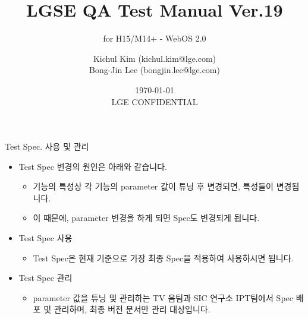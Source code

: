 \documentclass{beamer}
\title[WebOS 2.0 QA spec \alert{LGE CONFIDENTIAL}] %
{LGSE QA Test Manual Ver.19}
\subtitle
{for H15/M14+ - WebOS 2.0} %
\author[Kichul Kim, Bong-Jin Lee] %
{Kichul Kim (kichul.kim@lge.com)\\Bong-Jin Lee (bongjin.lee@lge.com)}
\institute[IPT team, SIC lab., LG Electronics] %
{
  IPT team, SIC lab., LG Electronics \\
  Release Link: (http://collab.lge.com/main/x/jLbjCQ)
  }
\date[Short Occasion] %
{\today\\ \alert{LGE CONFIDENTIAL}}
\begin{document}
\begin{frame}
  \titlepage
\end{frame}


\begin{frame}[t]{Test Spec. 사용 및 관리}

 \begin{itemize}
 \item Test Spec 변경의 원인은 아래와 같습니다.
 	\begin{itemize}
	\item 기능의 특성상 각 기능의 parameter 값이 튜닝 후 변경되면, 특성들이 변경됩니다.
	\item 이 때문에, parameter 변경을 하게 되면 Spec도 변경되게 됩니다.
	\end{itemize}
\end{itemize}

 \begin{itemize}
 \item Test Spec 사용
 	\begin{itemize}
 	\item Test Spec은 현재 기준으로 가장 최종 Spec을 적용하여 사용하시면 됩니다.
	\end{itemize}
\end{itemize}

 \begin{itemize}
 \item Test Spec 관리
 	\begin{itemize}
 	\item parameter 값을 튜닝 및 관리하는 TV 음팀과 SIC 연구소 IPT팀에서 Spec 배포 및 관리하며, 최종 버전 문서만 관리 대상입니다.
	\end{itemize}
\end{itemize}

\end{frame}
\end{document}
